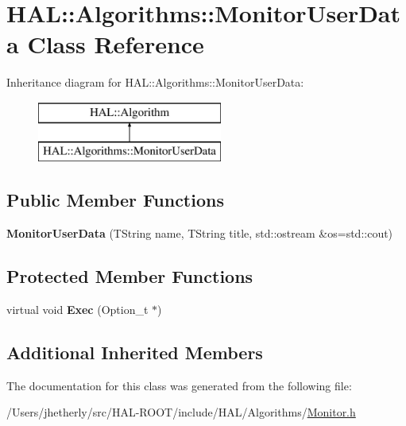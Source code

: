 \hypertarget{class_h_a_l_1_1_algorithms_1_1_monitor_user_data}{\section{H\+A\+L\+:\+:Algorithms\+:\+:Monitor\+User\+Data Class Reference}
\label{class_h_a_l_1_1_algorithms_1_1_monitor_user_data}
}
Inheritance diagram for H\+A\+L\+:\+:Algorithms\+:\+:Monitor\+User\+Data\+:\begin{figure}[H]
\begin{center}
\leavevmode
\includegraphics[height=2.000000cm]{class_h_a_l_1_1_algorithms_1_1_monitor_user_data}
\end{center}
\end{figure}
\subsection*{Public Member Functions}
\begin{DoxyCompactItemize}
\item 
\hypertarget{class_h_a_l_1_1_algorithms_1_1_monitor_user_data_acd4eeebf53037457c4b0e2095934a723}{{\bfseries Monitor\+User\+Data} (T\+String name, T\+String title, std\+::ostream \&os=std\+::cout)}\label{class_h_a_l_1_1_algorithms_1_1_monitor_user_data_acd4eeebf53037457c4b0e2095934a723}

\end{DoxyCompactItemize}
\subsection*{Protected Member Functions}
\begin{DoxyCompactItemize}
\item 
\hypertarget{class_h_a_l_1_1_algorithms_1_1_monitor_user_data_aea4229dea8ffbd7edfa8a4108e72205c}{virtual void {\bfseries Exec} (Option\+\_\+t $\ast$)}\label{class_h_a_l_1_1_algorithms_1_1_monitor_user_data_aea4229dea8ffbd7edfa8a4108e72205c}

\end{DoxyCompactItemize}
\subsection*{Additional Inherited Members}


The documentation for this class was generated from the following file\+:\begin{DoxyCompactItemize}
\item 
/\+Users/jhetherly/src/\+H\+A\+L-\/\+R\+O\+O\+T/include/\+H\+A\+L/\+Algorithms/\hyperlink{_monitor_8h}{Monitor.\+h}\end{DoxyCompactItemize}
